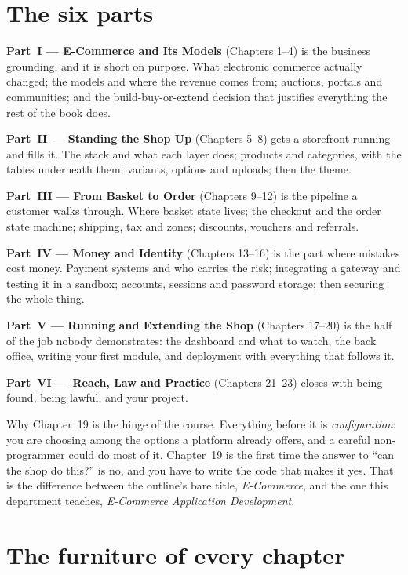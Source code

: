 \section*{The six parts}

\textbf{Part~I --- E-Commerce and Its Models} (Chapters 1--4) is the business
grounding, and it is short on purpose. What electronic commerce actually changed;
the models and where the revenue comes from; auctions, portals and communities;
and the build-buy-or-extend decision that justifies everything the rest of the
book does.

\textbf{Part~II --- Standing the Shop Up} (Chapters 5--8) gets a storefront
running and fills it. The stack and what each layer does; products and categories,
with the tables underneath them; variants, options and uploads; then the theme.

\textbf{Part~III --- From Basket to Order} (Chapters 9--12) is the pipeline a
customer walks through. Where basket state lives; the checkout and the order
state machine; shipping, tax and zones; discounts, vouchers and referrals.

\textbf{Part~IV --- Money and Identity} (Chapters 13--16) is the part where
mistakes cost money. Payment systems and who carries the risk; integrating a
gateway and testing it in a sandbox; accounts, sessions and password storage;
then securing the whole thing.

\textbf{Part~V --- Running and Extending the Shop} (Chapters 17--20) is the half
of the job nobody demonstrates: the dashboard and what to watch, the back office,
writing your first module, and deployment with everything that follows it.

\textbf{Part~VI --- Reach, Law and Practice} (Chapters 21--23) closes with being
found, being lawful, and your project.

\begin{conceptbox}
Why Chapter~19 is the hinge of the course. Everything before it is
\emph{configuration}: you are choosing among the options a platform already
offers, and a careful non-programmer could do most of it. Chapter~19 is the
first time the answer to ``can the shop do this?'' is no, and you have to write
the code that makes it yes. That is the difference between the outline's bare
title, \emph{E-Commerce}, and the one this department teaches,
\emph{E-Commerce Application Development}.
\end{conceptbox}

\section*{The furniture of every chapter}

